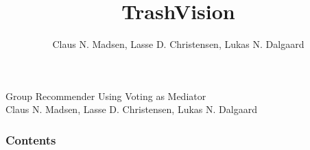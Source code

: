 \documentclass[10pt, hyperref={bookmarks=false}, show notes]{beamer}
\date
\begin{document}

\title[Group Recommender Using Voting as Mediator]{TrashVision}
\author[\insertframenumber /\inserttotalframenumber]{Claus N. Madsen, Lasse D. Christensen, Lukas N. Dalgaard}

\begin{frame}
\Large Group Recommender Using Voting as Mediator\\
\small Claus N. Madsen, Lasse D. Christensen, Lukas N. Dalgaard\\
\end{frame}

\begin{frame}
  \frametitle{Contents}
  \tableofcontents
\end{frame}







\section*{}
\end{document}
